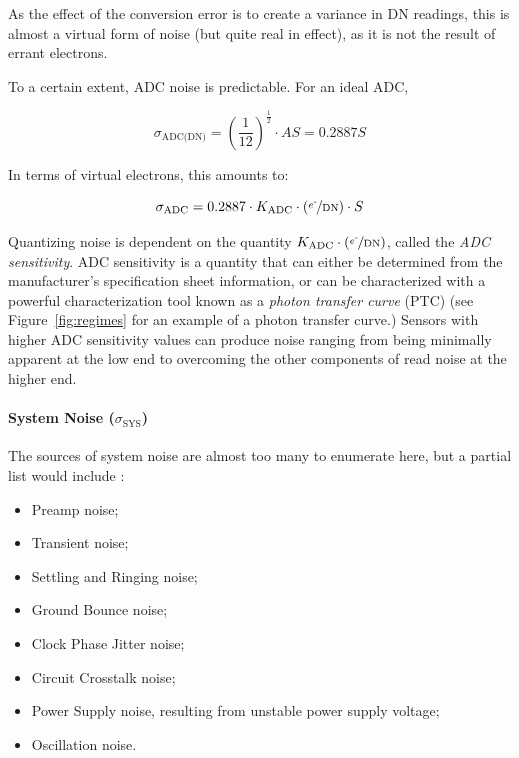 \documentclass[10pt]{article}
\begin{document}
As the effect of the conversion error is to create a variance in DN readings, this is almost a virtual form of noise (but quite real in effect), as it is not the result of errant electrons. 

To a certain extent, ADC noise is predictable. For an ideal ADC,

$$ \sigma_{\text{ADC(DN)}} = \left (\frac{1}{12} \right )^{\frac{1}{2}} \cdot AS = 0.2887S$$

\noindent In terms of virtual electrons, this amounts to:

$$ \sigma_{\text{ADC}} = 0.2887 \cdot K_{\text{ADC}} \cdot (\nicefrac{e^{\text{-}}}{\text{DN}}) \cdot S $$

\vspace{2mm}

\noindent Quantizing noise is dependent on the quantity $  K_{\text{ADC}} \cdot (\nicefrac{e^{\text{-}}}{\text{DN}}) $, called the \emph{ADC sensitivity}. ADC sensitivity is a quantity that can either be determined from the manufacturer's specification sheet information, or can be characterized with a powerful characterization tool known as a \emph{photon transfer curve} (PTC) (see Figure~\ref{fig:regimes} for an example of a photon transfer curve.) Sensors with higher ADC sensitivity values can produce noise ranging from being minimally apparent at the low end to overcoming the other components of read noise at the higher end. 

\paragraph{System Noise (\boldmath $\sigma_{\text{SYS}}$)}

The sources of system noise are almost too many to enumerate here, but a partial list would include \cite{janesick}:

\begin{itemize}[noitemsep]
\item Preamp noise;
\item Transient noise;
\item Settling and Ringing noise;
\item Ground Bounce noise;
\item Clock Phase Jitter noise;
\item Circuit Crosstalk noise;
\item Power Supply noise, resulting from unstable power supply voltage;
\item Oscillation noise.
\end{itemize}
\end{document}
